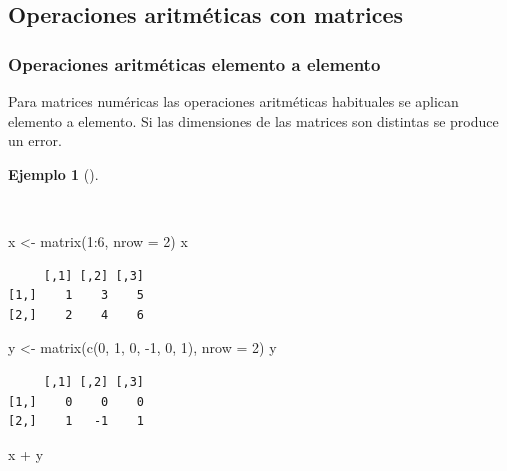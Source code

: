 \documentclass[
  spanish,
  a4paper,
]{scrreport}
\newenvironment{Shaded}{\begin{snugshade}}{\end{snugshade}}
\newcommand{\AttributeTok}[1]{\textcolor[rgb]{0.40,0.45,0.13}{#1}}
\newcommand{\DecValTok}[1]{\textcolor[rgb]{0.68,0.00,0.00}{#1}}
\newcommand{\FunctionTok}[1]{\textcolor[rgb]{0.28,0.35,0.67}{#1}}
\newcommand{\NormalTok}[1]{\textcolor[rgb]{0.00,0.23,0.31}{#1}}
\newcommand{\OtherTok}[1]{\textcolor[rgb]{0.00,0.23,0.31}{#1}}
\newcommand{\SpecialCharTok}[1]{\textcolor[rgb]{0.37,0.37,0.37}{#1}}
\theoremstyle{definition}
\theoremstyle{definition}
\newtheorem{example}{Ejemplo}[chapter]
\theoremstyle{remark}
\begin{document}
\subsection{Operaciones aritméticas con
matrices}\label{operaciones-aritmuxe9ticas-con-matrices}

\subsubsection{Operaciones aritméticas elemento a
elemento}\label{operaciones-aritmuxe9ticas-elemento-a-elemento-1}

Para matrices numéricas las operaciones aritméticas habituales se
aplican elemento a elemento. Si las dimensiones de las matrices son
distintas se produce un error.

\begin{example}[]\protect\hypertarget{exm-operaciones-aritmeticas-matrices}{}\label{exm-operaciones-aritmeticas-matrices}

~

\begin{Shaded}
\begin{Highlighting}[]
\NormalTok{x }\OtherTok{\textless{}{-}} \FunctionTok{matrix}\NormalTok{(}\DecValTok{1}\SpecialCharTok{:}\DecValTok{6}\NormalTok{, }\AttributeTok{nrow =} \DecValTok{2}\NormalTok{)}
\NormalTok{x}
\end{Highlighting}
\end{Shaded}

\begin{verbatim}
     [,1] [,2] [,3]
[1,]    1    3    5
[2,]    2    4    6
\end{verbatim}

\begin{Shaded}
\begin{Highlighting}[]
\NormalTok{y }\OtherTok{\textless{}{-}} \FunctionTok{matrix}\NormalTok{(}\FunctionTok{c}\NormalTok{(}\DecValTok{0}\NormalTok{, }\DecValTok{1}\NormalTok{, }\DecValTok{0}\NormalTok{, }\SpecialCharTok{{-}}\DecValTok{1}\NormalTok{, }\DecValTok{0}\NormalTok{, }\DecValTok{1}\NormalTok{), }\AttributeTok{nrow =} \DecValTok{2}\NormalTok{)}
\NormalTok{y}
\end{Highlighting}
\end{Shaded}

\begin{verbatim}
     [,1] [,2] [,3]
[1,]    0    0    0
[2,]    1   -1    1
\end{verbatim}

\begin{Shaded}
\begin{Highlighting}[]
\NormalTok{x }\SpecialCharTok{+}\NormalTok{ y}
\end{Highlighting}
\end{Shaded}


\end{example}
\end{document}
